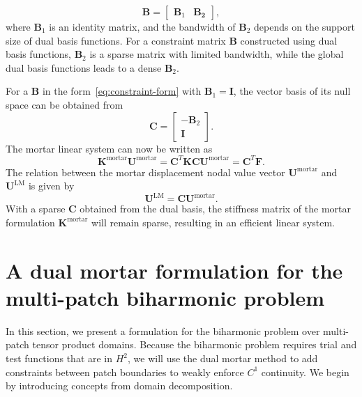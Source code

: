 \begin{equation}\label{eq:constraint-form}
  \mathbf{B}=\begin{bmatrix}
    \mathbf{B}_1 & \mathbf{B_2}
  \end{bmatrix},
\end{equation}
where $\mathbf{B}_1$ is an identity matrix, and the bandwidth of $\mathbf{B}_2$ depends on the support size of dual basis functions. For a constraint matrix $\mathbf{B}$ constructed using \Bezier dual basis functions, $\mathbf{B}_2$ is a sparse matrix with limited bandwidth, while the global dual basis functions leads to a dense $\mathbf{B}_2$.\par

For a $\mathbf{B}$ in the form~\eqref{eq:constraint-form} with $\mathbf{B}_1 = \mathbf{I}$, the vector basis of its null space can be obtained from
\begin{equation}
  \mathbf{C}=\begin{bmatrix}
    -\mathbf{B}_2 \\
    \mathbf{I}
  \end{bmatrix}.
  \label{eq:null-space}
\end{equation}
The mortar linear system can now be written as
\begin{equation}
  \mathbf{K}^{\text{mortar}}\mathbf{U}^{\text{mortar}}=\mathbf{C}^T\mathbf{K}\mathbf{C}\mathbf{U}^{\text{mortar}}=\mathbf{C}^T\mathbf{F}.\label{eq:mortar-form-discretized}
\end{equation}
The relation between the mortar displacement nodal value vector $\mathbf{U}^{\text{mortar}}$ and $\mathbf{U}^{\text{LM}}$ is given by
\begin{equation}
  \mathbf{U}^{\text{LM}}=\mathbf{C}\mathbf{U}^{\text{mortar}}.
\end{equation}
With a sparse $\mathbf{C}$ obtained from the \Bezier dual basis, the stiffness matrix of the mortar formulation $\mathbf{K}^{\text{mortar}}$ will remain sparse, resulting in an efficient linear system.

\section{A dual mortar formulation for the multi-patch biharmonic problem}
\label{sec:dual-mortar-formulation}

In this section, we present a formulation for the biharmonic problem over multi-patch tensor product domains. Because the biharmonic problem requires trial and test functions that are in $H^2$, we will use the dual mortar method to add constraints between patch boundaries to weakly enforce $C^1$ continuity. We begin by introducing concepts from domain decomposition.

